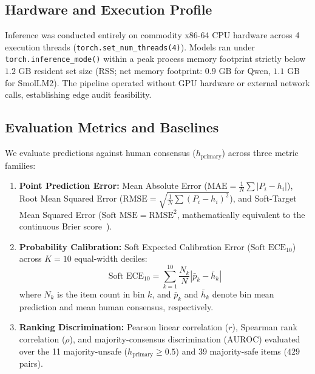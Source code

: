 \subsection{Hardware and Execution Profile}
\label{sec:hardware_profile}

Inference was conducted entirely on commodity x86-64 CPU hardware across 4 execution threads (\texttt{torch.set\_num\_threads(4)}). Models ran under \texttt{torch.inference\_mode()} within a peak process memory footprint strictly below $1.2\text{ GB}$ resident set size (RSS; net memory footprint: $0.9\text{ GB}$ for Qwen, $1.1\text{ GB}$ for SmolLM2). The pipeline operated without GPU hardware or external network calls, establishing edge audit feasibility.

\subsection{Evaluation Metrics and Baselines}
\label{sec:metrics_and_baselines}

We evaluate predictions against human consensus ($h_{\text{primary}}$) across three metric families:
\begin{enumerate}
    \item \textbf{Point Prediction Error:} Mean Absolute Error ($\text{MAE} = \frac{1}{N}\sum |P_i - h_i|$), Root Mean Squared Error ($\text{RMSE} = \sqrt{\frac{1}{N}\sum (P_i - h_i)^2}$), and Soft-Target Mean Squared Error ($\text{Soft MSE} = \text{RMSE}^2$, mathematically equivalent to the continuous Brier score~\cite{brier1950verification}).
    \item \textbf{Probability Calibration:} Soft Expected Calibration Error ($\text{Soft ECE}_{10}$) across $K=10$ equal-width deciles:
    \begin{equation}
        \text{Soft ECE}_{10} = \sum_{k=1}^{10} \frac{N_k}{N} |\bar{p}_k - \bar{h}_k|
        \label{eq:ece}
    \end{equation}
    where $N_k$ is the item count in bin $k$, and $\bar{p}_k$ and $\bar{h}_k$ denote bin mean prediction and mean human consensus, respectively.
    \item \textbf{Ranking Discrimination:} Pearson linear correlation ($r$), Spearman rank correlation ($\rho$), and majority-consensus discrimination ($\text{AUROC}$) evaluated over the 11 majority-unsafe ($h_{\text{primary}} \ge 0.5$) and 39 majority-safe items ($429$ pairs).
\end{enumerate}

